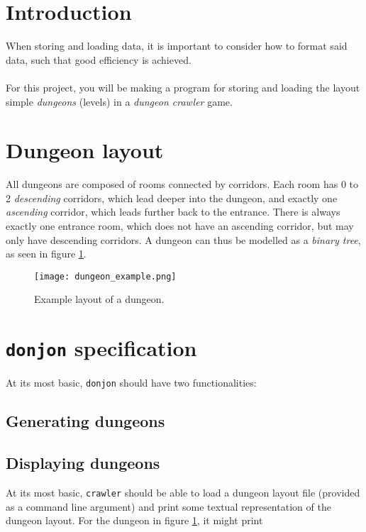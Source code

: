 \documentclass[12pt]{article}
\begin{document}
\maketitle

\section{Introduction}
When storing and loading data, it is important to consider how to format said data, such that good efficiency is achieved.\\\\
For this project, you will be making a program for storing and loading the layout simple \textit{dungeons} (levels) in a \textit{dungeon crawler} game.

\section{Dungeon layout}
All dungeons are composed of rooms connected by corridors. Each room has 0 to 2 \textit{descending} corridors, which lead deeper into the dungeon, and exactly one \textit{ascending} corridor, which leads further back to the entrance. There is always exactly one entrance room, which does not have an ascending corridor, but may only have descending corridors. A dungeon can thus be modelled as a \textit{binary tree}, as seen in figure \ref{fig:example_dungeon}.

\begin{figure}
  \centering
  \texttt{[image: dungeon\_example.png]}
  \caption{Example layout of a dungeon.}
  \label{fig:example_dungeon}
\end{figure}

\section{\texttt{donjon} specification}
At its most basic, \texttt{donjon} should have two functionalities:

\subsection{Generating dungeons}


\subsection{Displaying dungeons}
At its most basic, \texttt{crawler} should be able to load a dungeon layout file (provided as a command line argument) and print some textual representation of the dungeon layout. For the dungeon in figure \ref{fig:example_dungeon}, it might print
\end{document}
